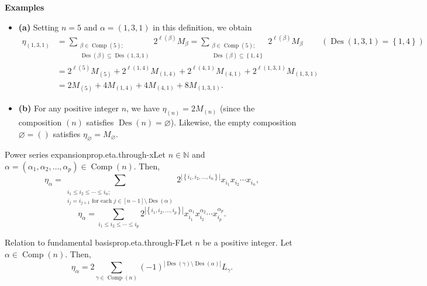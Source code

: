 \documentclass[numbers=enddot,12pt,final,onecolumn,notitlepage]{scrartcl}%
\newcommand{\NN}{\mathbb{N}} %
\newcommand{\Des}{\operatorname{Des}}
\newcommand{\Comp}{\operatorname{Comp}}
\newcommand{\0}{\phantom{c}}
\let\sumnonlimits\sum
\renewcommand{\sum}{\sumnonlimits\limits}
\begin{document}
\textbf{Examples}
\begin{itemize}
\item \textbf{(a)} Setting $n=5$ and $\alpha=\left(  1,3,1\right)  $ in this
definition, we obtain%
\begin{align*}
\eta_{\left(  1,3,1\right)  }  &  =\sum_{\substack{\beta
\in \Comp(5);\\\Des\left(  \beta\right)  \subseteq \Des\left(
1,3,1\right)  }}2^{\ell\left(  \beta\right)  }M_{\beta}=\sum_{\substack{\beta
\in \Comp(5);\\\Des\left(  \beta\right)  \subseteq
\left\{  1,4\right\}  }}2^{\ell\left(  \beta\right)  }M_{\beta}%
\ \ \ \ \ \ \ \ \ \ \left(\Des\left(  1,3,1\right)  =\left\{
1,4\right\}  \right) \\
&  =2^{\ell\left(  5\right)  }M_{\left(  5\right)  }+2^{\ell\left(
1,4\right)  }M_{\left(  1,4\right)  }+2^{\ell\left(  4,1\right)  }M_{\left(
4,1\right)  }+2^{\ell\left(  1,3,1\right)  }M_{\left(  1,3,1\right)  }%
\\
&=2M_{\left(  5\right)  }+4M_{\left(  1,4\right)
}+4M_{\left(  4,1\right)  }+8M_{\left(  1,3,1\right)  }.
\end{align*}


\item \textbf{(b)} For any positive integer $n$, we have $\eta_{\left(  n\right)
}=2M_{\left(  n\right)  }$
(since the composition $\left(n\right)$ satisfies
$\Des\left(n\right) = \varnothing$).
Likewise, the empty composition $\varnothing
=\left(  {}\right)  $ satisfies $\eta_{\varnothing}=M_{\varnothing}$.

\end{itemize}

\begin{proposition}{Power series expansion}{prop.eta.through-x}Let $n\in\NN$ and $\alpha=\left(  \alpha_{1},\alpha_{2}%
,\ldots,\alpha_{p}\right) \in
\Comp(n)$. Then,
\[
\eta_{\alpha}=\sum_{\substack{i_{1}\leq i_{2}\leq\cdots\leq
i_{n}  ;\\i_j=i_{j+1}\text{ for each }j\in\left[  n-1\right]
\setminus \Des\left(  \alpha\right)  }}2^{\left\vert \left\{  i_{1},i_{2}%
,\ldots,i_{n}\right\}  \right\vert }x_{i_{1}}x_{i_{2}}\cdots x_{i_{n}},
\]
\[
\eta_{\alpha}=\sum_{i_{1}\leq i_{2}\leq\cdots\leq i_{p}}2^{\left\vert \left\{
i_{1},i_{2},\ldots,i_{p}\right\}  \right\vert }x_{i_{1}}^{\alpha_{1}}x_{i_{2}%
}^{\alpha_{2}}\cdots x_{i_{p}}^{\alpha_{p}}.
\]
\end{proposition}

\begin{proposition}{Relation to fundamental basis}{prop.eta.through-F}Let $n$ be a positive integer. Let $\alpha
\in \Comp(n)$. Then,%
\[
\eta_{\alpha}=2\sum_{\gamma\in \Comp(n)}\left(
-1\right)  ^{\left\vert \Des\left(  \gamma\right)  \setminus \Des\left(
\alpha\right)  \right\vert }L_{\gamma}.
\]

\end{proposition}
\end{document}
